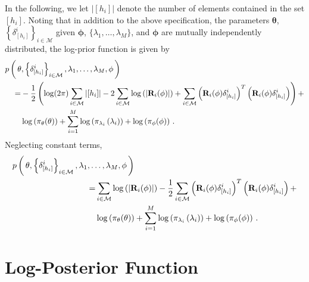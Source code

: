 \documentclass[11pt, oneside]{article}   	%
\begin{document}
\vspace{5mm}

\noindent
In the following, we let $|[h_i]|$ denote the number of elements contained in the set $[h_i]$.  Noting that in addition to the above specification, the parameters $\mathbf{\theta}$, $\left\{ \delta_{[h_i]}^i \right\}_{i \in \mathcal{M}}$ given $\mathbf{\phi}$, $\{ \lambda_1, \ldots, \lambda_M \}$, and $\mathbf{\phi}$ are mutually independently distributed, the log-prior function is given by
\begin{align*}
\MoveEqLeft p \left( \, \mathbf{\theta}, \left\{ \mathbf{\delta}_{[h_i]}^i \right\}_{i \in \mathcal{M}}, \lambda_1, \ldots, \lambda_M, \mathbf{\phi} \, \right) \\
=& -\frac{1}{2} \left( \log(2 \pi) \sum_{i \in \mathcal{M}} |[h_i]| - 2\sum_{i \in \mathcal{M}} \log \left( \left| \mathbf{R}_i (\mathbf{\phi}) \right| \right) + \sum_{i \in \mathcal{M}}  \left( \mathbf{R}_i (\mathbf{\phi}) \mathbf{\delta}_{[h_i]}^i \right)^T \left( \mathbf{R}_i (\mathbf{\phi}) \mathbf{\delta}_{[h_i]}^i \right) \right) +\\
& \log \left( \pi_{\theta} (\mathbf{\theta}) \right) + \sum_{i=1}^M \log \left( \pi_{\lambda_i} \left( \lambda_i \right) \right) + \log \left( \pi_\phi ( \mathbf{\phi} ) \right) \,.
\end{align*}
Neglecting constant terms,
\begin{align*}
\MoveEqLeft[10] p \left( \, \mathbf{\theta}, \left\{ \mathbf{\delta}_{[h_i]}^i \right\}_{i \in \mathcal{M}}, \lambda_1, \ldots, \lambda_M, \mathbf{\phi} \, \right) \\
=& \sum_{i \in \mathcal{M}} \log \left( \left| \mathbf{R}_i (\mathbf{\phi}) \right| \right) - \frac{1}{2} \sum_{i \in \mathcal{M}}  \left( \mathbf{R}_i (\mathbf{\phi}) \mathbf{\delta}_{[h_i]}^i \right)^T \left( \mathbf{R}_i (\mathbf{\phi}) \mathbf{\delta}_{[h_i]}^i \right) +\\
& \log \left( \pi_{\theta} (\mathbf{\theta}) \right) + \sum_{i=1}^M \log \left( \pi_{\lambda_i} \left( \lambda_i \right) \right) + \log \left( \pi_\phi ( \mathbf{\phi} ) \right) \,.
\end{align*}

\section{Log-Posterior Function}
\end{document}
